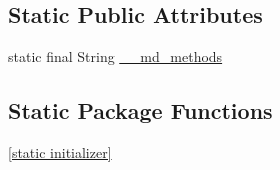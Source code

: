 \subsection*{Static Public Attributes}
\begin{CompactItemize}
\item 
static final String \hyperlink{classmd5b60ffeb829f638581ab2bb9b1a7f4f3f_1_1_cell_adapter_be33e45a7b887b1383f9c0ebda43ef00}{\_\-\_\-md\_\-methods}
\end{CompactItemize}
\subsection*{Static Package Functions}
\begin{CompactItemize}
\item 
\hyperlink{classmd5b60ffeb829f638581ab2bb9b1a7f4f3f_1_1_cell_adapter_c7c95358c7dafe01adfe68203283f13b}{\mbox{[}static initializer\mbox{]}}
\end{CompactItemize}
